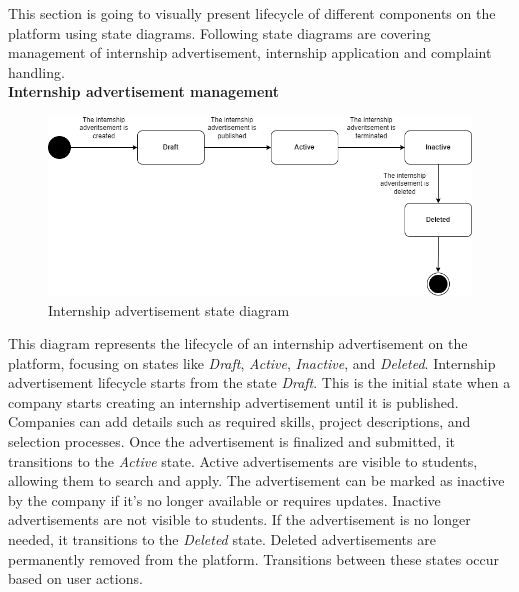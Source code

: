 \quad This section is going to visually present lifecycle of different components on the platform using state diagrams. Following state diagrams are covering management of internship advertisement, internship application and complaint handling. \\

\textbf{Internship advertisement management}\\
\begin{figure}[H]
	\includegraphics[width=\textwidth,height=\textheight,keepaspectratio]{RASD-Latex/assets/state_diagram.png}
	\caption{Internship advertisement state diagram}
	\label{fig:DataRequest}
\end{figure}

This diagram represents the lifecycle of an internship advertisement on the platform, focusing on states like \textit{Draft}, \textit{Active}, \textit{Inactive}, and \textit{Deleted}. Internship advertisement lifecycle starts from the state \textit{Draft}. This is the initial state when a company starts creating an internship advertisement until it is published. Companies can add details such as required skills, project descriptions, and selection processes. Once the advertisement is finalized and submitted, it transitions to the \textit{Active} state. Active advertisements are visible to students, allowing them to search and apply. The advertisement can be marked as inactive by the company if it's no longer available or requires updates. Inactive advertisements are not visible to students. If the advertisement is no longer needed, it transitions to the \textit{Deleted} state. Deleted advertisements are permanently removed from the platform. Transitions between these states occur based on user actions.\\

